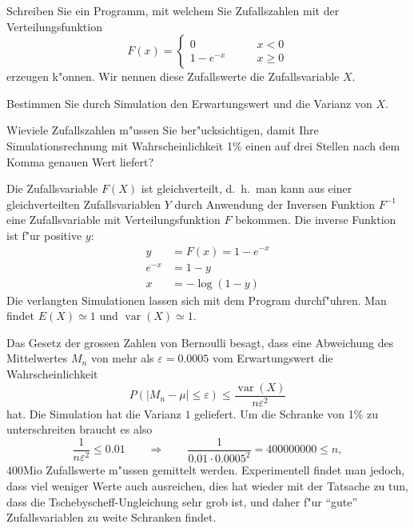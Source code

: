 Schreiben Sie ein Programm, mit welchem Sie Zufallszahlen mit der
Verteilungsfunktion
\[
F(x)=\begin{cases}
0&\qquad x< 0\\
1-e^{-x}&\qquad x\ge 0
\end{cases}
\]
erzeugen k"onnen. Wir nennen diese Zufallswerte die Zufallsvariable $X$.
\begin{teilaufgaben}
\item Bestimmen Sie durch Simulation den Erwartungswert und die Varianz
von $X$.
\item Wieviele Zufallszahlen m"ussen Sie ber"ucksichtigen, damit Ihre
Simulationsrechnung mit Wahrscheinlichkeit 1\% einen auf drei Stellen
nach dem Komma genauen Wert liefert?
\end{teilaufgaben}

\begin{loesung}
\begin{teilaufgaben}
\item Die Zufallsvariable $F(X)$ ist gleichverteilt, d.~h.~man kann aus
einer gleichverteilten Zufallsvariablen $Y$ durch Anwendung der Inversen
Funktion $F^{-1}$ eine Zufallsvariable mit Verteilungsfunktion $F$ bekommen.
Die inverse Funktion ist f"ur positive $y$:
\begin{align*}
y&=F(x)=1-e^{-x}\\
e^{-x}&=1-y\\
x&=-\log(1-y)
\end{align*}
Die verlangten Simulationen lassen sich mit dem Program
durchf"uhren. Man findet $E(X)\simeq 1$ und $\operatorname{var}(X)\simeq 1$.
\item
Das Gesetz der grossen Zahlen von Bernoulli besagt, dass 
eine Abweichung des Mittelwertes $M_n$ von mehr als $\varepsilon= 0.0005$
vom Erwartungswert die Wahrscheinlichkeit
\[
P(|M_n-\mu| \le \varepsilon)\le \frac{\operatorname{var}(X)}{n\varepsilon^2}
\]
hat. Die Simulation hat die Varianz $1$ geliefert.
Um die Schranke von 1\% zu unterschreiten braucht es also
\[
\frac1{n\varepsilon^2}\le 0.01
\qquad\Rightarrow\qquad
\frac1{0.01\cdot 0.0005^2}=400000000\le n,
\]
400Mio Zufallswerte m"ussen gemittelt werden. Experimentell findet man
jedoch, dass viel weniger Werte auch ausreichen, dies hat wieder mit der
Tatsache zu tun, dass die Tschebyscheff-Ungleichung sehr grob ist, und
daher f"ur ``gute'' Zufallsvariablen zu weite Schranken findet.
\qedhere
\end{teilaufgaben}
\end{loesung}

